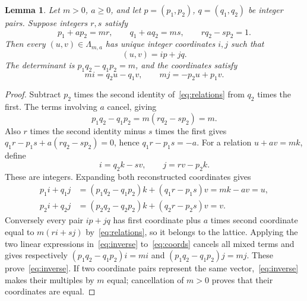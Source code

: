 \documentclass{article}
\newtheorem{lemma}{Lemma}
\begin{document}
\begin{lemma}\label{lem:basis}
  Let \(m>0\), \(a\ge0\), and let
  \(p=(p_1,p_2)\), \(q=(q_1,q_2)\) be integer pairs. Suppose integers \(r,s\)
  satisfy
  \begin{equation}\label{eq:relations}
    p_1+ap_2=mr,\qquad q_1+aq_2=ms,\qquad rq_2-sp_2=1.
  \end{equation}
  Then every \((u,v)\in\Lambda_{m,a}\) has unique integer coordinates \(i,j\)
  such that
  \begin{equation}\label{eq:coords}
    (u,v)=ip+jq.
  \end{equation}
  The determinant is \(p_1q_2-q_1p_2=m\), and the coordinates satisfy
  \begin{equation}\label{eq:inverse}
    mi=q_2u-q_1v,\qquad mj=-p_2u+p_1v.
  \end{equation}
\end{lemma}

\begin{proof}
  Subtract \(p_2\) times the second identity of~\eqref{eq:relations} from \(q_2\)
  times the first. The terms involving \(a\) cancel, giving
  \begin{equation}\label{eq:det}
    p_1q_2-q_1p_2=m(rq_2-sp_2)=m.
  \end{equation}
  Also \(r\) times the second identity minus \(s\) times the first gives
  \(q_1r-p_1s+a(rq_2-sp_2)=0\), hence \(q_1r-p_1s=-a\).
  For a relation \(u+av=mk\), define
  \begin{equation}\label{eq:defij}
    i=q_2k-sv,\qquad j=rv-p_2k.
  \end{equation}
  These are integers. Expanding both reconstructed coordinates gives
  \begin{equation}\label{eq:reconstruct}
    \begin{aligned}
      p_1i+q_1j
      &= (p_1q_2-q_1p_2)k+(q_1r-p_1s)v
      =mk-av=u,\\
      p_2i+q_2j
      &= (p_2q_2-q_2p_2)k+(q_2r-p_2s)v=v.
    \end{aligned}
  \end{equation}
  Conversely every pair \(ip+jq\) has first coordinate plus \(a\) times
  second coordinate equal to \(m(ri+sj)\) by~\eqref{eq:relations}, so it belongs to the
  lattice. Applying the two linear expressions in~\eqref{eq:inverse} to~\eqref{eq:coords}
  cancels all mixed terms and gives respectively \((p_1q_2-q_1p_2)i=mi\) and
  \((p_1q_2-q_1p_2)j=mj\). These prove~\eqref{eq:inverse}. If two coordinate pairs
  represent the same vector,~\eqref{eq:inverse} makes their multiples by \(m\) equal;
  cancellation of \(m>0\) proves that their coordinates are equal.
\end{proof}
\end{document}
